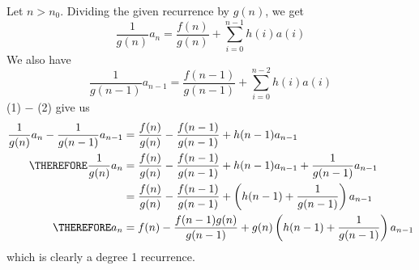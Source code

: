 Let $n > n_0$.
Dividing the given recurrence by $g(n)$, we get
\[
  \frac{1}{g(n)} a_n = \frac{f(n)}{g(n)} + \sum_{i=0}^{n-1} h(i) a(i) \tag{1}
\]
We also have
\[
  \frac{1}{g(n-1)} a_{n-1} = \frac{f(n-1)}{g(n-1)} + \sum_{i=0}^{n-2} h(i) a(i) \tag{2}
\]
(1) $-$ (2) give us
\begin{align*}
  \frac{1}{g(n)} a_n - \frac{1}{g(n-1)} a_{n-1}
  &= \frac{f(n)}{g(n)} - \frac{f(n-1)}{g(n-1)} + h(n-1) a_{n-1} \\
  \THEREFORE
  \frac{1}{g(n)} a_n 
  &= \frac{f(n)}{g(n)} - \frac{f(n-1)}{g(n-1)} + h(n-1) a_{n-1} + \frac{1}{g(n-1)} a_{n-1}\\
  &= \frac{f(n)}{g(n)} - \frac{f(n-1)}{g(n-1)} + \left( h(n-1) + \frac{1}{g(n-1)} \right)
  a_{n-1}
  \\
  \THEREFORE
  a_n 
  &= f(n) - \frac{f(n-1)g(n)}{g(n-1)} + g(n)\left( h(n-1) + \frac{1}{g(n-1)} \right)
  a_{n-1}\\
\end{align*}
which is clearly a degree 1 recurrence.
